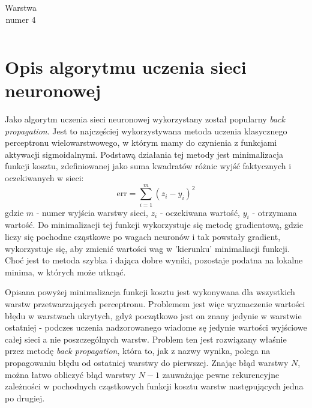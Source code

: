 \documentclass{classrep}
\begin{document}
{\begin{table}[!htbp]
\begin{tabular}{|c|c|c|c|c|c|l|}
            \end{tabular}
            \caption{Warstwa numer 4}
            \end{table}
        \FloatBarrier

    }
    \section{Opis algorytmu uczenia sieci neuronowej} {
        Jako algorytm uczenia sieci neuronowej wykorzystany został popularny \emph{back
        propagation}.  Jest to najczęściej wykorzystywana metoda uczenia klasycznego perceptronu
        wielowarstwowego, w którym mamy do czynienia z funkcjami aktywacji sigmoidalnymi. Podstawą
        działania tej metody jest minimalizacja funkcji kosztu, zdefiniowanej jako suma kwadratów
        różnic wyjść faktycznych i oczekiwanych w sieci:
        \begin{equation}
            \textrm{err} = \sum_{i = 1}^{m}(z_i - y_i)^2
        \end{equation}
        gdzie $m$ - numer wyjścia warstwy sieci, $z_i$ - oczekiwana wartość, $y_i$ - otrzymana
        wartość. Do minimalizacji tej funkcji wykorzystuje się metodę gradientową, gdzie liczy się
        pochodne cząstkowe po wagach neuronów i tak powstały gradient, wykorzystuje się, aby zmienić
        wartości wag w 'kierunku' minimaliacji funkcji. Choć jest to metoda szybka i dająca dobre
        wyniki, pozostaje podatna na lokalne minima, w których może utknąć.

        Opisana powyżej minimalizacja funkcji kosztu jest wykonywana dla wszystkich warstw
        przetwarzających perceptronu. Problemem jest więc wyznaczenie wartości błędu w warstwach
        ukrytych, gdyż początkowo jest on znany jedynie w warstwie ostatniej - podczes uczenia
        nadzorowanego wiadome sę jedynie wartości wyjściowe całej sieci a nie poszczególnych warstw.
        Problem ten jest rozwiązany właśnie przez metodę \emph{back propagation}, która to, jak z
        nazwy wynika, polega na propagowaniu błędu od ostatniej warstwy do pierwszej. Znając błąd
        warstwy $N$, można łatwo obliczyć błąd warstwy $N - 1$ zauważając pewne rekurencyjne
        zależności w pochodnych cząstkowych funkcji kosztu warstw następujących jedna po drugiej.
    }
\end{document}
